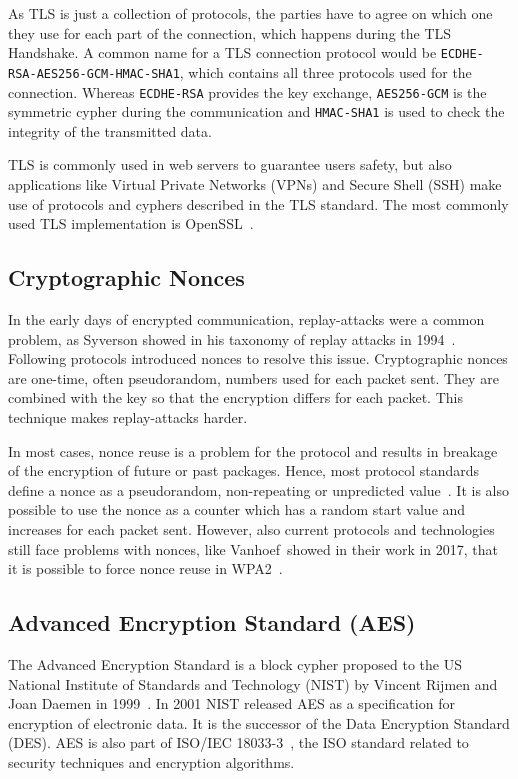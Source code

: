 As TLS is just a collection of protocols, the parties have to agree on which one
they use for each part of the connection, which happens during the TLS
Handshake. A common name for a TLS connection protocol would be
\texttt{ECDHE-RSA-AES256-GCM-HMAC-SHA1}, which contains all three protocols used
for the connection. Whereas \texttt{ECDHE-RSA} provides the key exchange,
\texttt{AES256-GCM} is the  symmetric cypher during the communication and
\texttt{HMAC-SHA1} is used to check the integrity of the transmitted data.

TLS is commonly used in web servers to guarantee user\textquotesingle s safety,
but also applications like Virtual Private Networks (VPNs) and Secure Shell
(SSH) make use of protocols and cyphers described in the TLS standard. The most
commonly used TLS implementation is OpenSSL~\cite{opensslweb}.

\subsection{Cryptographic Nonces}

In the early days of encrypted communication, replay-attacks were a common
problem, as Syverson showed in his taxonomy of replay attacks in
1994~\cite{replaytax}. Following protocols introduced nonces to resolve this
issue. Cryptographic nonces are one-time, often pseudorandom, numbers used for
each packet sent. They are combined with the key so that the encryption differs
for each packet. This technique makes replay-attacks harder.

In most cases, nonce reuse is a problem for the protocol and results in breakage
of the encryption of future or past packages. Hence, most protocol standards
define a nonce as a pseudorandom, non-repeating or unpredicted
value~\cite{noncegeneral}. It is also possible to use the nonce as a counter
which has a random start value and increases for each packet sent. However, also
current protocols and technologies still face problems with nonces, like
Vanhoef~\etal showed in their work in 2017, that it is possible to force nonce
reuse in WPA2~\cite{wpanoncereuse}.

\subsection{Advanced Encryption Standard (AES)}

The Advanced Encryption Standard is a block cypher proposed to the US National
Institute of Standards and Technology (NIST) by Vincent Rijmen and Joan Daemen
in 1999~\cite{aesproposal}. In 2001 NIST released AES as a specification for
encryption of electronic data. It is the successor of the Data Encryption
Standard (DES). AES is also part of ISO/IEC 18033-3~\cite{iso18033}, the ISO
standard related to security techniques and encryption algorithms.

